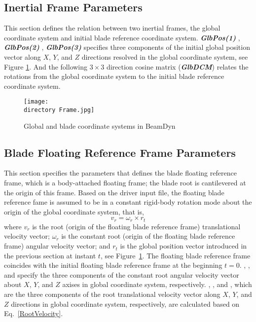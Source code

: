 \subsection{Inertial Frame Parameters}
This section defines the relation between two inertial frames, the global coordinate system and initial blade reference coordinate system. 
\textbf{\textit{GlbPos(1)} }, \textbf{\textit{GlbPos(2)} }, \textbf{\textit{GlbPos(3)} } specifies three components of the initial global position vector along $X$, $Y$, and $Z$ directions resolved in the global coordinate system, see Figure \ref{fig:Frame}. 
And the following $3 \times 3$ direction cosine matrix (\textbf{\textit{GlbDCM}}) relates the rotations from the global coordinate system to the initial blade reference coordinate system. 

\begin{figure}[h!tp]
    \centering
    \texttt{[image: \\directory Frame.jpg]}
    \caption{Global and blade coordinate systems in BeamDyn}
    \label{fig:Frame}
\end{figure}

\subsection{Blade Floating Reference Frame Parameters}

This section specifies the parameters that defines the blade floating reference frame, which is a body-attached floating frame; the blade root is cantilevered at the origin of this frame. 
Based on the driver input file, the floating blade reference fame is assumed to be in a constant rigid-body rotation mode about the origin of the global coordinate system, that is,
\begin{equation}
   \label{RootVelocity}
   v_r = \omega_r \times r_t
\end{equation}
where $v_r$ is the root (origin of the floating blade reference frame) translational velocity vector; $\omega_r$ is the constant root (origin of the floating blade reference frame) angular velocity vector; and $r_t$ is the global position vector introduced in the previous section at instant $t$, see Figure~\ref{fig:Frame}.  
The floating blade reference frame coincides with the initial floating blade reference frame at the beginning $t=0$. 
, , and  specify the three components of the constant root angular velocity vector about  $X$, $Y$, and $Z$ axises in global coordinate system, respectively.  
, , and , which are the three components of the root translational velocity vector along  $X$, $Y$, and $Z$ directions in global coordinate system, respectively, are calculated based on Eq.~\ref{RootVelocity}. 

